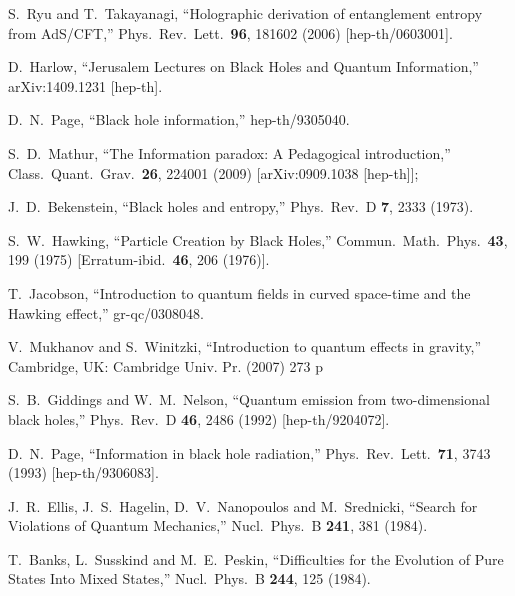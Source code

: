 \documentclass[12pt]{article}
\begin{document}
\begin{thebibliography}{99}
  S.~Ryu and T.~Takayanagi,
  ``Holographic derivation of entanglement entropy from AdS/CFT,''
  Phys.\ Rev.\ Lett.\  {\bf 96}, 181602 (2006)
  [hep-th/0603001].
  
  D.~Harlow,
  ``Jerusalem Lectures on Black Holes and Quantum Information,''
  arXiv:1409.1231 [hep-th].

  D.~N.~Page,
  ``Black hole information,''
  hep-th/9305040.
  
  S.~D.~Mathur,
  ``The Information paradox: A Pedagogical introduction,''
  Class.\ Quant.\ Grav.\  {\bf 26}, 224001 (2009)
  [arXiv:0909.1038 [hep-th]];

  J.~D.~Bekenstein,
  ``Black holes and entropy,''
  Phys.\ Rev.\ D {\bf 7}, 2333 (1973).
  
  S.~W.~Hawking,
  ``Particle Creation by Black Holes,''
  Commun.\ Math.\ Phys.\  {\bf 43}, 199 (1975)
  [Erratum-ibid.\  {\bf 46}, 206 (1976)].

  T.~Jacobson,
  ``Introduction to quantum fields in curved space-time and the Hawking effect,''
  gr-qc/0308048.
  
  V.~Mukhanov and S.~Winitzki,
  ``Introduction to quantum effects in gravity,''
  Cambridge, UK: Cambridge Univ. Pr. (2007) 273 p
    
  S.~B.~Giddings and W.~M.~Nelson,
  ``Quantum emission from two-dimensional black holes,''
  Phys.\ Rev.\ D {\bf 46}, 2486 (1992)
  [hep-th/9204072].
  
  D.~N.~Page,
  ``Information in black hole radiation,''
  Phys.\ Rev.\ Lett.\  {\bf 71}, 3743 (1993)
  [hep-th/9306083].
  
  J.~R.~Ellis, J.~S.~Hagelin, D.~V.~Nanopoulos and M.~Srednicki,
  ``Search for Violations of Quantum Mechanics,''
  Nucl.\ Phys.\ B {\bf 241}, 381 (1984).
  
  T.~Banks, L.~Susskind and M.~E.~Peskin,
  ``Difficulties for the Evolution of Pure States Into Mixed States,''
  Nucl.\ Phys.\ B {\bf 244}, 125 (1984).
  

\end{thebibliography}
\end{document}
